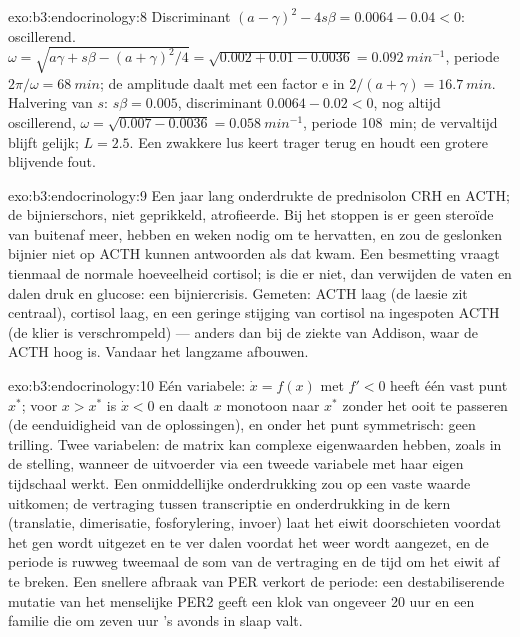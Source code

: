 \begin{solution}{exo:b3:endocrinology:8}
Discriminant $(a - \gamma)^{2} - 4s\beta = 0.0064 - 0.04 < 0$:
oscillerend. $\omega = \sqrt{a\gamma + s\beta - (a+\gamma)^{2}/4} =
\sqrt{0.002 + 0.01 - 0.0036} = \qty{0.092}{min^{-1}}$, periode $2\pi/
\omega = \qty{68}{min}$; de amplitude daalt met een factor $\mathrm{e}$
in $2/(a +
\gamma) = \qty{16.7}{min}$. Halvering van $s$: $s\beta = 0.005$,
discriminant $0.0064 - 0.02 < 0$, nog altijd oscillerend,
$\omega = \sqrt{0.007 - 0.0036}
= \qty{0.058}{min^{-1}}$, periode \qty{108}{min}; de vervaltijd blijft
gelijk; $L = 2.5$. Een zwakkere lus keert trager terug en houdt een
grotere blijvende fout.
\end{solution}

\begin{solution}{exo:b3:endocrinology:9}
Een jaar lang onderdrukte de prednisolon CRH en ACTH; de bijnierschors,
niet geprikkeld, atrofieerde. Bij het stoppen is er geen steroïde van
buitenaf meer, hebben  en  weken nodig om te
hervatten, en zou de geslonken bijnier niet op ACTH kunnen antwoorden
als dat kwam. Een besmetting vraagt tienmaal de normale hoeveelheid
cortisol; is die er niet, dan verwijden de vaten en dalen druk en
glucose: een bijniercrisis. Gemeten: ACTH laag (de laesie zit
centraal), cortisol laag, en een geringe stijging van cortisol na
ingespoten ACTH (de klier is verschrompeld) --- anders dan bij de
ziekte van Addison, waar de ACTH hoog is. Vandaar het langzame
afbouwen.
\end{solution}

\begin{solution}{exo:b3:endocrinology:10}
Eén variabele: $\dot x = f(x)$ met $f' < 0$ heeft één vast punt
$x^{*}$; voor $x > x^{*}$ is $\dot x < 0$ en daalt $x$ monotoon naar
$x^{*}$ zonder het ooit te passeren (de eenduidigheid van de
oplossingen), en onder het punt symmetrisch: geen trilling. Twee
variabelen: de matrix kan complexe eigenwaarden hebben, zoals in de
stelling, wanneer de uitvoerder via een tweede variabele met haar eigen
tijdschaal werkt. Een onmiddellijke onderdrukking zou op een vaste
waarde uitkomen; de vertraging tussen transcriptie en onderdrukking in
de kern (translatie, dimerisatie, fosforylering, invoer) laat het eiwit
doorschieten voordat het gen wordt uitgezet en te ver dalen voordat het
weer wordt aangezet, en de periode is ruwweg tweemaal de som van de
vertraging en de tijd om het eiwit af te breken. Een snellere afbraak
van PER verkort de periode: een destabiliserende mutatie van het
menselijke PER2 geeft een klok van ongeveer 20 uur en een familie die
om zeven uur 's avonds in slaap valt.
\end{solution}

